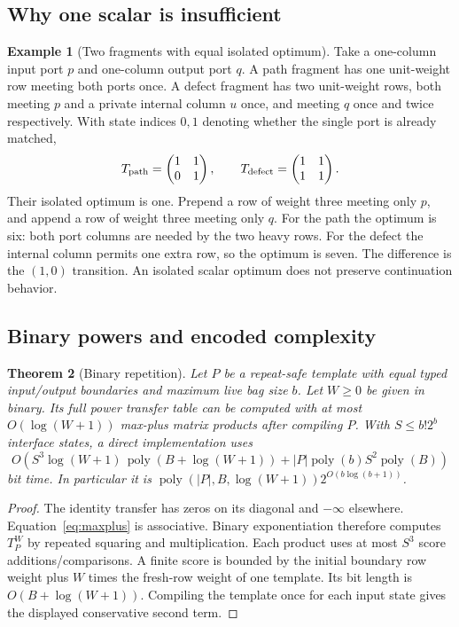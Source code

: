\documentclass[11pt,a4paper]{article}
\newtheorem{theorem}{Theorem}[section]
\theoremstyle{definition}
\newtheorem{example}[theorem]{Example}
\theoremstyle{remark}
\newcommand{\mi}{-\infty}
\begin{document}
\subsection{Why one scalar is insufficient}
\begin{example}[Two fragments with equal isolated optimum]
\label{ex:scalar}
Take a one-column input port $p$ and one-column output port $q$.
A path fragment has one unit-weight row meeting both ports once. A defect
fragment has two unit-weight rows, both meeting $p$ and a private internal
column $u$ once, and meeting $q$ once and twice respectively. With state
indices $0,1$ denoting whether the single port is already matched,
\[
 T_{\rm path}=\begin{pmatrix}1&1\\0&1\end{pmatrix},\qquad
 T_{\rm defect}=\begin{pmatrix}1&1\\1&1\end{pmatrix}.
\]
Their isolated optimum is one. Prepend a row of weight three meeting only
$p$, and append a row of weight three meeting only $q$. For the path the
optimum is six: both port columns are needed by the two heavy rows. For
the defect the internal column permits one extra row, so the optimum is
seven. The difference is the $(1,0)$ transition. An isolated scalar
optimum does not preserve continuation behavior.
\end{example}

\subsection{Binary powers and encoded complexity}
\begin{theorem}[Binary repetition]
\label{thm:powers}
Let $P$ be a repeat-safe template with equal typed input/output boundaries
and maximum live bag size $b$. Let $W\geq0$ be given in binary. Its full
power transfer table can be computed with at most
$O(\log(W+1))$ max-plus matrix products after compiling $P$. With
$S\leq b!2^b$ interface states, a direct implementation uses
\begin{equation}
 O\!\left(S^3\log(W+1)\,
     \operatorname{poly}(B+\log(W+1))
     +|P|\operatorname{poly}(b)S^2\operatorname{poly}(B)\right)
 \label{eq:powerbound}
\end{equation}
bit time. In particular it is
$\operatorname{poly}(|P|,B,\log(W+1))2^{O(b\log(b+1))}$.
\end{theorem}
\begin{proof}
The identity transfer has zeros on its diagonal and $\mi$ elsewhere.
Equation~\eqref{eq:maxplus} is associative. Binary exponentiation therefore
computes $T_P^W$ by repeated squaring and multiplication. Each product
uses at most $S^3$ score additions/comparisons. A finite score is bounded
by the initial boundary row weight plus $W$ times the fresh-row weight of
one template. Its bit length is $O(B+\log(W+1))$. Compiling the template
once for each input state gives the displayed conservative second term.
\end{proof}
\end{document}
